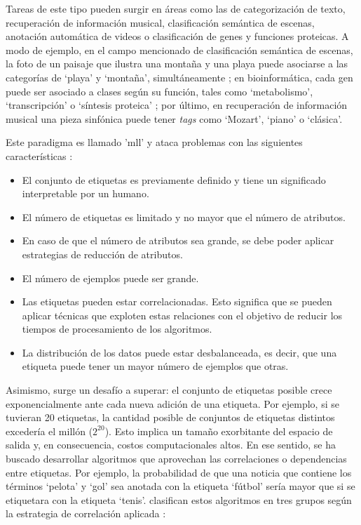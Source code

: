 Tareas de este tipo pueden surgir en áreas como las de categorización de texto,
recuperación de información musical, clasificación semántica de escenas,
anotación automática de videos o  clasificación de genes y funciones proteicas.
A modo de ejemplo, en el campo mencionado de clasificación semántica de escenas,
la foto de un paisaje que ilustra una montaña y una playa puede asociarse a las
categorías de ‘playa’ y ‘montaña’, simultáneamente \cite{gibaja_tutorial_2015};
en bioinformática, cada gen puede ser asociado a clases según su función, tales
como ‘metabolismo’, ‘transcripción’ o ‘síntesis proteica’
\cite{zhang_multi-label_2010}; por último, en recuperación de información
musical una pieza sinfónica puede tener \textit{tags} como ‘Mozart’, ‘piano’ o
‘clásica’.

Este paradigma es llamado '\acrlong{mll}'   y ataca problemas con las siguientes
características \cite{gibaja_tutorial_2015}:

\begin{itemize}

	\item El conjunto de etiquetas es previamente definido y tiene un significado
	      interpretable por un humano.

	\item El número de etiquetas es limitado y no mayor que el número de
	      atributos.

	\item En caso de que el número de atributos sea grande, se debe poder aplicar
	      estrategias de reducción de atributos.

	\item El número de ejemplos puede ser grande.

	\item Las etiquetas pueden estar correlacionadas. Esto significa que se
	      pueden aplicar técnicas que exploten estas relaciones con el objetivo de
	      reducir los tiempos de procesamiento de los algoritmos.

	\item La distribución de los datos puede estar desbalanceada, es decir, que
	      una etiqueta puede tener un mayor número de ejemplos que otras.

\end{itemize}

Asimismo, surge un desafío a superar: el conjunto de etiquetas posible crece
exponencialmente ante cada nueva adición de una etiqueta. Por ejemplo, si se
tuvieran 20 etiquetas, la cantidad posible de conjuntos de etiquetas distintos
excedería el millón (\(2^{20}\)). Esto implica un tamaño exorbitante del espacio
de salida y, en consecuencia, costos computacionales altos. En ese sentido, se
ha buscado desarrollar algoritmos que aprovechan las correlaciones o
dependencias entre etiquetas. Por ejemplo, la probabilidad de que una noticia
que contiene los términos ‘pelota’ y ‘gol’ sea anotada con la etiqueta ‘fútbol’
sería mayor que si se etiquetara con la etiqueta ‘tenis’.
\citeauthor{zhang_multi-label_2010} clasifican estos algoritmos en tres grupos
según la estrategia de correlación aplicada \cite{zhang_multi-label_2010}:

